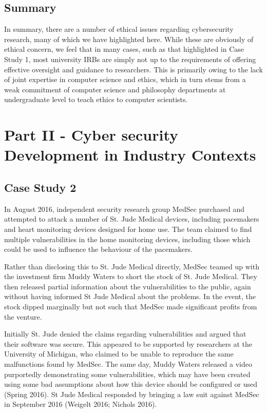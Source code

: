\documentclass{svjour3}                     %
\begin{document}
\subsection{Summary}
\label{sec:summary}
In summary, there are a number of ethical issues regarding cybersecurity research, many of which we have highlighted here.  While these are obviously of ethical concern, we feel that in many cases, such as that highlighted in Case Study 1, most university IRBs are simply not up to the requirements of offering effective oversight and guidance to researchers. This is primarily owing to the lack of joint expertise in computer science and ethics, which in turn stems from a weak commitment of computer science and philosophy departments at undergraduate level to teach ethics to computer scientists.

\section{Part II - Cyber security Development in Industry Contexts }
\label{sec:practice}
\subsection{Case Study 2}
\label{sec:case2}
In August 2016, independent security research group MedSec purchased and attempted to attack a number of St. Jude Medical devices, including pacemakers and heart monitoring devices designed for home use. The team claimed to find multiple vulnerabilities in the home monitoring devices, including those which could be used to influence the behaviour of the pacemakers.

Rather than disclosing this to St. Jude Medical directly, MedSec teamed up with the investment firm Muddy Waters to short the stock of St. Jude Medical. They then released partial information about the vulnerabilities to the public, again without having informed St Jude Medical about the problems.  In the event, the stock dipped marginally but not such that MedSec made significant profits from the venture.

Initially St. Jude denied the claims regarding vulnerabilities and argued that their software was secure. This appeared to be supported by researchers at the University of Michigan, who claimed to be unable to reproduce the same malfunctions found by MedSec. The same day, Muddy Waters released a video purportedly demonstrating some vulnerabilities, which may have been created using some bad assumptions about how this device should be configured or used (Spring 2016). St Jude Medical responded by bringing a law suit against MedSec in September 2016 (Weigelt 2016; Nichols 2016).
\end{document}
